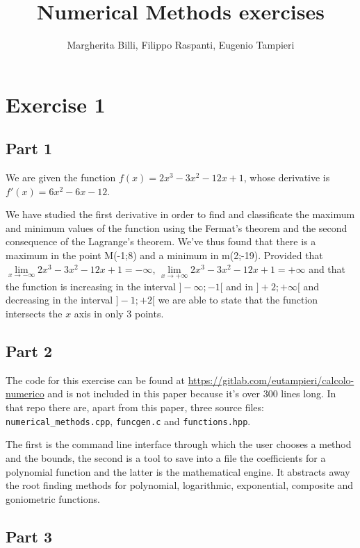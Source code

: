 \documentclass[a4paper,12pt]{article}
\title{Numerical Methods exercises}
\author{Margherita Billi, Filippo Raspanti, Eugenio Tampieri}
\begin{document}
\maketitle
\section{Exercise 1}
\subsection{Part 1}
\par We are given the function $f(x)=2x^3-3x^2-12x+1$, whose derivative is $f'(x)=6x^2-6x-12$.
\par We have studied the first derivative in order to find and classificate the maximum and minimum values of the function using the Fermat’s theorem and the second consequence of the Lagrange’s theorem.
We’ve thus found that there is a maximum in the point M(-1;8) and a minimum in m(2;-19).
Provided that $\lim\limits_{x \to -\infty} 2x^3-3x^2-12x+1 = -\infty$, $\lim\limits_{x \to +\infty} 2x^3-3x^2-12x+1 = +\infty$ and that the function is increasing in the interval $]-\infty;-1[$ and in $]+2;+\infty[$ and decreasing in the interval $]-1;+2[$ we are able to state that the function intersects the $x$ axis in only 3 points.
\subsection{Part 2}
\par The code for this exercise can be found at \url{https://gitlab.com/eutampieri/calcolo-numerico} and is not included in this paper because it's over 300 lines long. In that repo there are, apart from this paper, three source files: \verb|numerical_methods.cpp|, \verb|funcgen.c| and \verb|functions.hpp|.
\par The first is the command line interface through which the user chooses a method and the bounds, the second is a tool to save into a file the coefficients for a polynomial function and the latter is the mathematical engine. It abstracts away the root finding methods for polynomial, logarithmic, exponential, composite and goniometric functions.
\subsection{Part 3}
\end{document}
